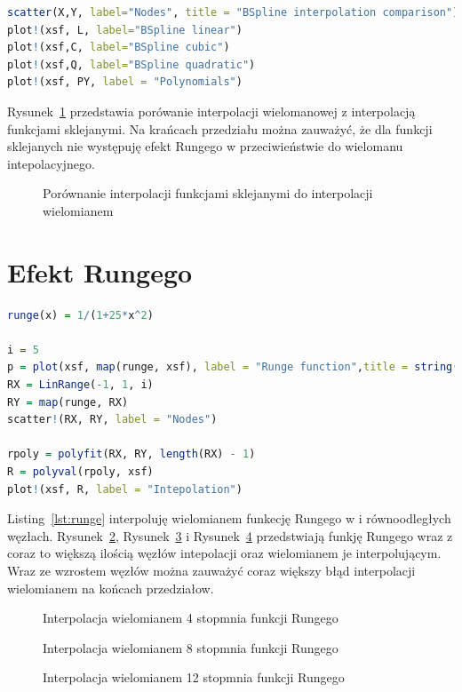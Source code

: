 \documentclass[12pt, a4paper]{article}
\begin{document}
\clearpage
\begin{lstlisting}[caption={Porównanie interpolacji funkcjami sklejanymi do interpolacji wielomianem},language=R,label={lst:cmp}]
scatter(X,Y, label="Nodes", title = "BSpline interpolation comparison")
plot!(xsf, L, label="BSpline linear")
plot!(xsf,C, label="BSpline cubic")
plot!(xsf,Q, label="BSpline quadratic")
plot!(xsf, PY, label = "Polynomials")
\end{lstlisting}
Rysunek~\ref{fig:cmp} przedstawia porówanie interpolacji wielomanowej z interpolacją funkcjami sklejanymi. Na krańcach przedziału można zauważyć, że dla funkcji sklejanych nie występuję efekt Rungego w przeciwieństwie do wielomanu intepolacyjnego.
\begin{figure}[ht!]
	\centering    
	\def\svgwidth{\columnwidth}
	
	\caption{Porównanie interpolacji funkcjami sklejanymi do interpolacji wielomianem}
	\label{fig:cmp}
\end{figure}
\clearpage
\section{Efekt Rungego}
\begin{lstlisting}[caption={Efekt Rungego},language=R,label={lst:runge}]
runge(x) = 1/(1+25*x^2)

i = 5
p = plot(xsf, map(runge, xsf), label = "Runge function",title = string("Runge's phenomenon (Nodes = ", i, ""))
RX = LinRange(-1, 1, i)
RY = map(runge, RX)
scatter!(RX, RY, label = "Nodes")

rpoly = polyfit(RX, RY, length(RX) - 1)
R = polyval(rpoly, xsf)
plot!(xsf, R, label = "Intepolation")
\end{lstlisting}
Listing~\ref{lst:runge} interpoluję wielomianem funkecję Rungego w i równoodległych węzłach. Rysunek~\ref{fig:runge5},  Rysunek~\ref{fig:runge9} i Rysunek~\ref{fig:runge13} przedstwiają funkję Rungego wraz z coraz to większą ilością węzłów intepolacji oraz wielomianem je interpolującym. Wraz ze wzrostem węzłów można zauważyć coraz większy błąd interpolacji wielomianem na końcach przedziałow.
\begin{figure}[ht!]
	\centering    
	\def\svgwidth{\columnwidth}
	
	\caption{Interpolacja wielomianem 4 stopmnia funkcji Rungego}
	\label{fig:runge5}
\end{figure}
\begin{figure}[ht!]  
	\def\svgwidth{\columnwidth}
	
	\caption{Interpolacja wielomianem 8 stopmnia funkcji Rungego}
	\label{fig:runge9}
\end{figure}
\begin{figure}[ht!]
	\centering    
	\def\svgwidth{\columnwidth}
	
	\caption{Interpolacja wielomianem 12 stopmnia funkcji Rungego}
	\label{fig:runge13}
\end{figure}
\clearpage
\end{document}
